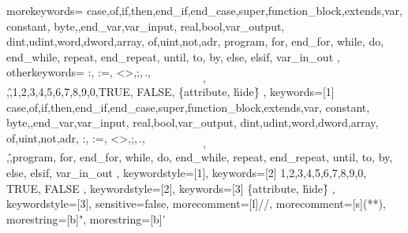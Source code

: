 
{
	morekeywords={
	case,of,if,then,end_if,end_case,super,function_block,extends,var,
	constant, byte,,end_var,var_input, real,bool,var_output,
	dint,udint,word,dword,array, of,uint,not,adr, program, for, end_for, while, do, end_while, repeat, end_repeat, until, to, by, else, elsif, var_in_out
	},
	otherkeywords={
		:, :=, <>,;,\,.,\[,\],\^,1,2,3,4,5,6,7,8,9,0,TRUE, FALSE, \{attribute,  \'hide\'\}
	},
	keywords=[1]{
		case,of,if,then,end_if,end_case,super,function_block,extends,var,
		constant, byte,,end_var,var_input, real,bool,var_output,
		dint,udint,word,dword,array, of,uint,not,adr, :, :=, <>,;,\,.,\[,\],\^,program, for, end_for, while, do, end_while, repeat, end_repeat, until, to, by, else, elsif, var_in_out
	},
	keywordstyle=[1]\color{blue},
	keywords=[2]{
		1,2,3,4,5,6,7,8,9,0, TRUE, FALSE
	},
	keywordstyle=[2]\color{codepurple},
	keywords=[3]{
		\{attribute,  \'hide\'\}
	},
	keywordstyle=[3]\color{codegray},
	sensitive=false,
	morecomment=[l]{//}, 
	morecomment=[s]{(*}{*)},
	morestring=[b]{"},
	morestring=[b]{'}
}

